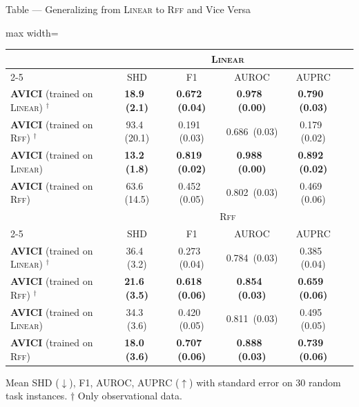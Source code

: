 \documentclass[aspectratio=169,10pt]{beamer}
\newcommand{\err}[1]{\tiny{$\,$(#1)}}
\newcommand{\highlight}[1]{\textbf{#1}}
\newcommand{\domain}[1]{\textsc{#1}}
\newcommand{\lineardomain}{\domain{Linear}\xspace}
\newcommand{\rffdomain}{\domain{Rff}\xspace}
\newcommand{\ours}{AVICI\xspace}
\begin{document}
\begin{frame}{Table --- Generalizing from \lineardomain to \rffdomain and Vice Versa}
\scriptsize
\begin{adjustbox}{max width=\textwidth}
\begin{tabular}{lccccc}
\toprule
& \multicolumn{4}{c}{\domain{Linear}}  \\
\cmidrule{2-5}
 & SHD & F1 & AUROC & AUPRC \\
\midrule
\textbf{\ours} (trained on \lineardomain) ${}^\dagger$  & \highlight{18.9 \err{2.1}}  & \highlight{0.672 \err{0.04}} &  \highlight{0.978 \err{0.00}} &  \highlight{0.790 \err{0.03}} \\
\textbf{\ours} (trained on \rffdomain) ${}^\dagger$  &  93.4 \err{20.1} &  0.191 \err{0.03} &  0.686 \err{0.03} &  0.179 \err{0.02}  \\
\midrule
\textbf{\ours} (trained on \lineardomain)  & \highlight{13.2 \err{1.8}}  &  \highlight{0.819 \err{0.02}} &  \highlight{0.988 \err{0.00}} &  \highlight{0.892 \err{0.02}}\\
\textbf{\ours} (trained on \rffdomain)  &  63.6 \err{14.5} &  0.452 \err{0.05} &  0.802 \err{0.03} &  0.469 \err{0.06} \\
\midrule
& \multicolumn{4}{c}{\domain{Rff}} \\
\cmidrule{2-5}
 & SHD & F1 & AUROC & AUPRC   \\
\midrule
\textbf{\ours} (trained on \lineardomain) ${}^\dagger$ &              36.4 \err{3.2} &              0.273 \err{0.04} &  0.784 \err{0.03} &              0.385 \err{0.04}  \\
\textbf{\ours} (trained on \rffdomain) ${}^\dagger$ &  \highlight{21.6 \err{3.5}} &  \highlight{0.618 \err{0.06}} &  \highlight{0.854 \err{0.03}} &  \highlight{0.659 \err{0.06}}  \\
\midrule
\textbf{\ours} (trained on \lineardomain)  &              34.3 \err{3.6} &              0.420 \err{0.05} & 0.811 \err{0.03} &              0.495 \err{0.05}  \\
\textbf{\ours} (trained on \rffdomain) &  \highlight{18.0 \err{3.6}} &  \highlight{0.707 \err{0.06}} &  \highlight{0.888 \err{0.03}} &  \highlight{0.739 \err{0.06}}  \\
\bottomrule
\end{tabular}
\end{adjustbox}

\vspace{0.2cm}
{\footnotesize Mean SHD ($\downarrow$), F1, AUROC, AUPRC ($\uparrow$) with standard error on \num{30} random task instances. $\dagger$ Only observational data.}
\end{frame}
\end{document}
